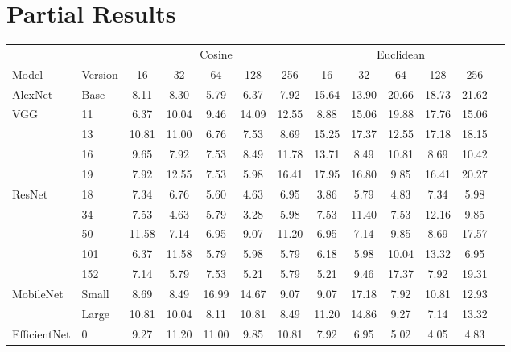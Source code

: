 \section{Partial Results}
\label{sec:results}

\begin{table}[ht]
\centering
\setlength{\tabcolsep}{4pt}
\begin{tabular}{llccccc|cccccc}
\toprule
& & \multicolumn{5}{c}{Cosine} & \multicolumn{5}{c}{Euclidean} \\
\cmidrule(lr){3-7} \cmidrule(lr){8-12}
Model & Version & 16 & 32 & 64 & 128 & 256 & 16 & 32 & 64 & 128 & 256 \\
\midrule
AlexNet                 & Base  & 8.11 & 8.30 & 5.79 & 6.37 & 7.92 & 15.64 & 13.90 & 20.66 & 18.73 & 21.62 \\
\midrule
\multirow{4}{*}{VGG}    & 11    & 6.37 & 10.04 & 9.46 & 14.09 & 12.55 & 8.88 & 15.06 & 19.88 & 17.76 & 15.06 \\
                        & 13    & 10.81 & 11.00 & 6.76 & 7.53 & 8.69 & 15.25 & 17.37 & 12.55 & 17.18 & 18.15 \\
                        & 16    & 9.65 & 7.92 & 7.53 & 8.49 & 11.78 & 13.71 & 8.49 & 10.81 & 8.69 & 10.42 \\
                        & 19    & 7.92 & 12.55 & 7.53 & 5.98 & 16.41 & 17.95 & 16.80 & 9.85 & 16.41 & 20.27 \\
\midrule
\multirow{5}{*}{ResNet} & 18    & 7.34 & 6.76 & 5.60 & 4.63 & 6.95 & 3.86 & 5.79 & 4.83 & 7.34 & 5.98 \\
                        & 34    & 7.53 & 4.63 & 5.79 & 3.28 & 5.98 & 7.53 & 11.40 & 7.53 & 12.16 & 9.85 \\
                        & 50    & 11.58 & 7.14 & 6.95 & 9.07 & 11.20 & 6.95 & 7.14 & 9.85 & 8.69 & 17.57 \\
                        & 101   & 6.37 & 11.58 & 5.79 & 5.98 & 5.79 & 6.18 & 5.98 & 10.04 & 13.32 & 6.95 \\
                        & 152   & 7.14 & 5.79 & 7.53 & 5.21 & 5.79 & 5.21 & 9.46 & 17.37 & 7.92 & 19.31 \\
\midrule
\multirow{2}{*}{MobileNet} & Small & 8.69 & 8.49 & 16.99 & 14.67 & 9.07 & 9.07 & 17.18 & 7.92 & 10.81 & 12.93 \\
                           & Large & 10.81 & 10.04 & 8.11 & 10.81 & 8.49 & 11.20 & 14.86 & 9.27 & 7.14 & 13.32 \\
\midrule
\multirow{4}{*}{EfficientNet} & 0  & 9.27 & 11.20 & 11.00 & 9.85 & 10.81 & 7.92 & 6.95 & 5.02 & 4.05 & 4.83 \\

\end{tabular}
\end{table}
